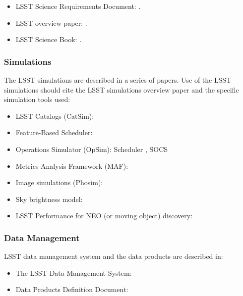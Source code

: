 \begin{itemize}
\item LSST Science Requirements Document: \cite{LPM-17}.
\item LSST overview paper: \cite{2008arXiv0805.2366I}.
\item LSST Science Book: \cite{abell2009lsst}.
\end{itemize}


\subsubsection{Simulations}

The LSST simulations are described in a series of papers. Use of the LSST simulations should cite the LSST simulations overview paper \cite{2014SPIE.9150E..14C} and the specific simulation tools used:

\begin{itemize}
\item LSST Catalogs (CatSim): \cite{2014SPIE.9150E..14C}
\item Feature-Based Scheduler: \cite{2018arXiv181004815N}
\item Operations Simulator (OpSim): Scheduler \cite{2016SPIE.9910E..13D}, SOCS \cite{2016SPIE.9911E..25R}
\item Metrics Analysis Framework (MAF): \cite{2014SPIE.9149E..0BJ}
\item Image simulations (Phosim): \cite{2015ApJS..218...14P}
\item Sky brightness model: \cite{2016SPIE.9910E..1AY}
\item LSST Performance for NEO (or moving object) discovery: \cite{2018Icar..303..181J}
\end{itemize}


\subsubsection{Data Management}

LSST data management system and the data products are described in:

\begin{itemize}
  \item The LSST Data Management System: \cite{2015arXiv151207914J}
  \item Data Products Definition Document: \cite{LSE-163}
\end{itemize}


